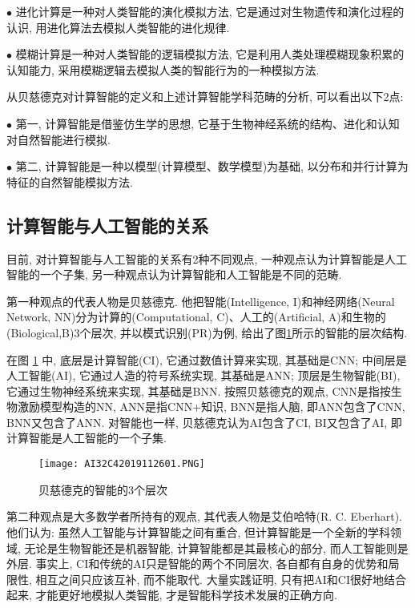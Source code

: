 $\bullet$ 进化计算是一种对人类智能的演化模拟方法, 它是通过对生物遗传和演化过程的认识, 用进化算法去模拟人类智能的进化规律.

$\bullet$ 模糊计算是一种对人类智能的逻辑模拟方法, 它是利用人类处理模糊现象积累的认知能力, 采用模糊逻辑去模拟人类的智能行为的一种模拟方法.

\begin{remark}
从贝慈德克对计算智能的定义和上述计算智能学科范畴的分析, 可以看出以下2点:

$\bullet$ 第一, 计算智能是借鉴仿生学的思想, 它基于生物神经系统的结构、进化和认知对自然智能进行模拟.

$\bullet$ 第二, 计算智能是一种以模型(计算模型、数学模型)为基础, 以分布和并行计算为特征的自然智能模拟方法.
\end{remark}
\subsection{计算智能与人工智能的关系}
目前, 对计算智能与人工智能的关系有2种不同观点, 一种观点认为计算智能是人工智能的一个子集, 另一种观点认为计算智能和人工智能是不同的范畴.

第一种观点的代表人物是贝慈德克. 他把智能(Intelligence, I)和神经网络(Neural Network, NN)分为计算的(Computational, C)、人工的(Artificial, A)和生物的(Biological,B)3个层次, 并以模式识别(PR)为例, 给出了图\ref{AI32fig26000001}所示的智能的层次结构.

在图 \ref{AI32fig26000001} 中, 底层是计算智能(CI), 它通过数值计算来实现, 其基础是CNN; 中间层是人工智能(AI), 它通过人造的符号系统实现, 其基础是ANN; 顶层是生物智能(BI), 它通过生物神经系统来实现, 其基础是BNN.
按照贝慈德克的观点, CNN是指按生物激励模型构造的NN, ANN是指CNN+知识, BNN是指人脑, 即ANN包含了CNN, BNN又包含了ANN. 对智能也一样, 贝慈德克认为AI包含了CI, BI又包含了AI, 即计算智能是人工智能的一个子集.
\begin{figure}[H]
    \centering
    \texttt{[image: AI32C42019112601.PNG]}
    \caption{贝慈德克的智能的3个层次}
    \label{AI32fig26000001}
\end{figure}

第二种观点是大多数学者所持有的观点, 其代表人物是艾伯哈特(R. C. Eberhart). 他们认为: 虽然人工智能与计算智能之间有重合, 但计算智能是一个全新的学科领域, 无论是生物智能还是机器智能, 计算智能都是其最核心的部分, 而人工智能则是外层.
事实上, CI和传统的AI只是智能的两个不同层次, 各自都有自身的优势和局限性, 相互之间只应该互补, 而不能取代.
大量实践证明, 只有把AI和CI很好地结合起来, 才能更好地模拟人类智能, 才是智能科学技术发展的正确方向.
